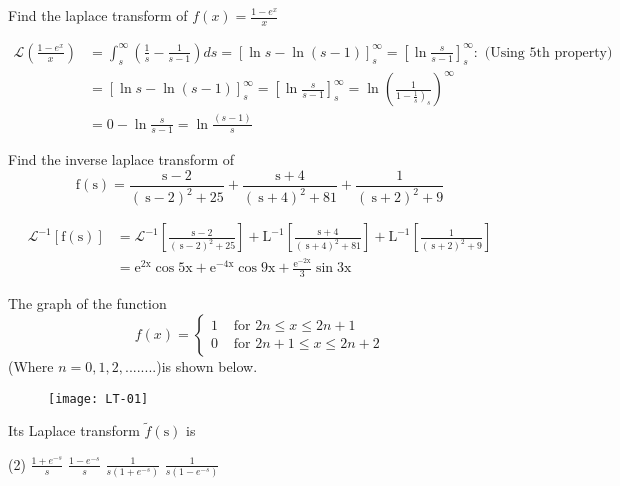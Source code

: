 \begin{exercise}
	Find the laplace transform of $f(x)=\frac{1-e^{x}}{x}$
\end{exercise}
\begin{answer}
	\begin{align*}
	\mathcal{L}\left(\frac{1-e^{x}}{x}\right)&=\int_{s}^{\infty}\left(\frac{1}{s}-\frac{1}{s-1}\right) d s=[\ln s-\ln (s-1)]_{s}^{\infty}=\left[\ln \frac{s}{s-1}\right]_{s}^{\infty}:\text{ (Using 5th property)}\\
	&=[\ln s-\ln (s-1)]_{s}^{\infty}=\left[\ln \frac{s}{s-1}\right]_{s}^{\infty}=\ln \left(\frac{1}{\left.1-\frac{1}{s}\right)_{s}}\right)^{\infty} \\
	&=0-\ln \frac{s}{s-1}=\ln \frac{(s-1)}{s}
	\end{align*}
\end{answer}
\begin{exercise}
	Find the inverse laplace transform of
	$$\mathrm{f}(\mathrm{s}) =\frac{\mathrm{s}-2}{(\mathrm{~s}-2)^{2}+25}+\frac{\mathrm{s}+4}{(\mathrm{~s}+4)^{2}+81}+\frac{1}{(\mathrm{~s}+2)^{2}+9} $$
\end{exercise}
\begin{answer}
	\begin{align*}
	\mathcal{L}^{-1}[\mathrm{f}(\mathrm{s})] &=\mathcal{L}^{-1}\left[\frac{\mathrm{s}-2}{(\mathrm{~s}-2)^{2}+25}\right]+\mathrm{L}^{-1}\left[\frac{\mathrm{s}+4}{(\mathrm{~s}+4)^{2}+81}\right]+\mathrm{L}^{-1}\left[\frac{1}{(\mathrm{~s}+2)^{2}+9}\right] \\
	&=\mathrm{e}^{2 \mathrm{x}} \cos 5 \mathrm{x}+\mathrm{e}^{-4 \mathrm{x}} \cos 9 \mathrm{x}+\frac{\mathrm{e}^{-2 \mathrm{x}}}{3} \sin 3 \mathrm{x}
	\end{align*}
\end{answer}
\begin{exercise}
	The graph of the function
	$$f(x)= \begin{cases}1 & \text { for } 2 n \leq x \leq 2 n+1 \\ 0 & \text { for } 2 n+1 \leq x \leq 2 n+2\end{cases}$$
	(Where $n=0,1,2,........$)is shown below.
	\begin{figure}[H]
		\centering
		\texttt{[image: LT-01]}
	\end{figure}
	Its Laplace transform $\tilde{f}(\mathrm{s})$ is
	\begin{tasks}(2)
		\task[\textbf{a.}]$\frac{1+e^{-s}}{s}$
		\task[\textbf{b.}]$\frac{1-e^{-s}}{s}$
		\task[\textbf{c.}]$\frac{1}{s\left(1+e^{-s}\right)}$
		\task[\textbf{d.}]  $\frac{1}{s\left(1-e^{-s}\right)}$
	\end{tasks}
\end{exercise}
